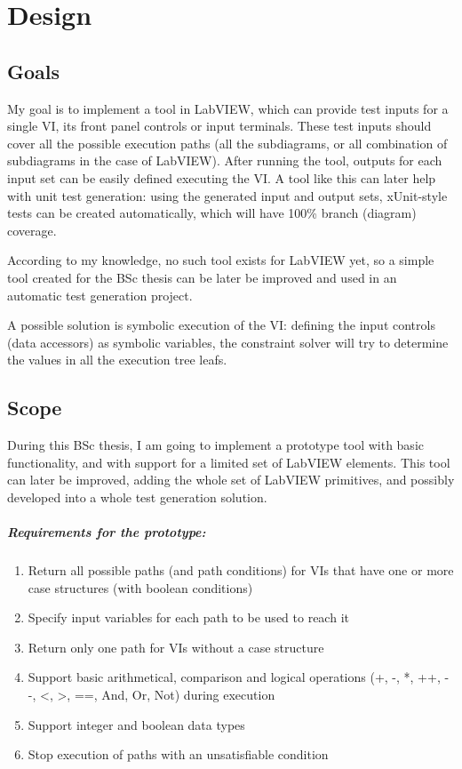 \chapter{Design}
\label{chap:design}
\section{Goals}
My goal is to implement a tool in LabVIEW, which can provide test inputs for a single VI, its front panel controls or input terminals. These test inputs should cover all the possible execution paths (all the subdiagrams, or all combination of subdiagrams in the case of LabVIEW). After running the tool, outputs for each input set can be easily defined executing the VI. A tool like this can later help with unit test generation: using the generated input and output sets, xUnit-style tests can be created automatically, which will have 100\% branch (diagram) coverage.

According to my knowledge, no such tool exists for LabVIEW yet, so a simple tool created for the BSc thesis can be later be improved and used in an automatic test generation project.

A possible solution is symbolic execution of the VI: defining the input controls (data accessors) as symbolic variables, the constraint solver will try to determine the values in all the execution tree leafs.
\section{Scope}
During this BSc thesis, I am going to implement a prototype tool with basic functionality, and with support for a limited set of LabVIEW elements. This tool can later be improved, adding the whole set of LabVIEW primitives, and possibly developed into a whole test generation solution. 

\paragraph{Requirements for the prototype:}
\begin{enumerate}
\item Return all possible paths (and path conditions) for VIs that have one or more case structures (with boolean conditions)
\item Specify input variables for each path to be used to reach it
\item Return only one path for VIs without a case structure
\item Support basic arithmetical, comparison and logical operations (+, -, *, ++, -{}-, <, >, ==, And, Or, Not) during execution
\item Support integer and boolean data types
\item Stop execution of paths with an unsatisfiable condition
\end{enumerate}

